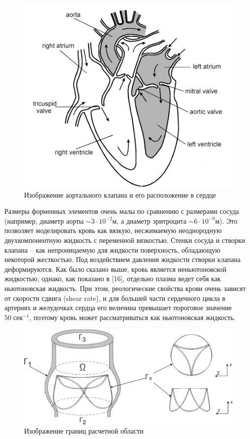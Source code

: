 \begin{figure}[htbp]
\centering
\includegraphics{heart_scheme.png}
\caption{\label{fig:heart_scheme}Изображение аортального клапана и его
расположение в сердце}
\end{figure}

Размеры форменных элементов очень малы по сравнению с размерами сосуда
(например, диаметр аорты \(\sim 3 \cdot 10^{-2}\text{м}\), а диаметр
эритроцита \(\sim 6 \cdot 10^{-9}\text{м}\)). Это позволяет моделировать
кровь как вязкую, несжимаемую неоднородную двухкомпонентную жидкость с
переменной вязкостью. Стенки сосуда и створки клапана -- как
непроницаемую для жидкости поверхность, обладающую некоторой жесткостью.
Под воздействием давления жидкости створки клапана деформируются. Как
было сказано выше, кровь является неньютоновской жидкостью, однако, как
показано в {[}16{]}, отдельно плазма ведет себя как ньютоновская
жидкость. При этом, реологические свойства крови очень зависят от
скорости сдвига (shear rate), и для большей части сердечного цикла в
артериях и желудочках сердца его величина превышает пороговое значение
\(50\; \text{сек}^{-1}\), поэтому кровь может рассматриваться как
ньютоновская жидкость.

\begin{figure}[htbp]
\centering
\includegraphics{aorta_valve_scheme.png}
\caption{\label{fig:aorta_valve_scheme}Изображение границ расчетной
области}
\end{figure}


